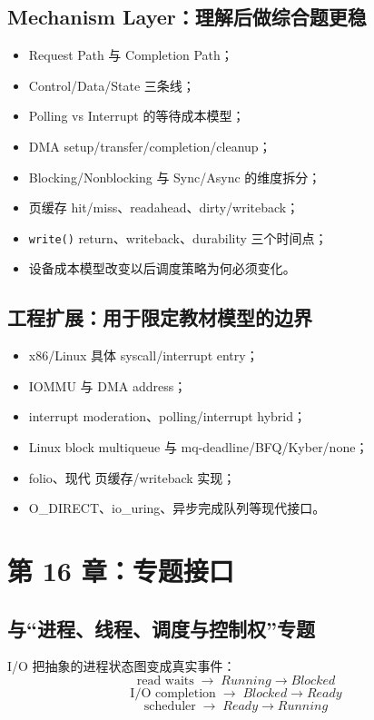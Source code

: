 \documentclass[UTF8,fontset=fandol,11pt,a4paper]{ctexart}
\newcommand{\code}[1]{\texttt{#1}}
\newcommand{\arr}{\;\longrightarrow\;}
\begin{document}
\subsection{Mechanism Layer：理解后做综合题更稳}
\begin{itemize}
  \item Request Path 与 Completion Path；
  \item Control/Data/State 三条线；
  \item Polling vs Interrupt 的等待成本模型；
  \item DMA setup/transfer/completion/cleanup；
  \item Blocking/Nonblocking 与 Sync/Async 的维度拆分；
  \item 页缓存 hit/miss、readahead、dirty/writeback；
  \item \code{write()} return、writeback、durability 三个时间点；
  \item 设备成本模型改变以后调度策略为何必须变化。
\end{itemize}

\subsection{工程扩展：用于限定教材模型的边界}
\begin{itemize}
  \item x86/Linux 具体 syscall/interrupt entry；
  \item IOMMU 与 DMA address；
  \item interrupt moderation、polling/interrupt hybrid；
  \item Linux block multiqueue 与 mq-deadline/BFQ/Kyber/none；
  \item folio、现代 页缓存/writeback 实现；
  \item O\_DIRECT、io\_uring、异步完成队列等现代接口。
\end{itemize}

\section{第 16 章：专题接口}

\subsection{与“进程、线程、调度与控制权”专题}
I/O 把抽象的进程状态图变成真实事件：
\[
\boxed{\text{read waits}\arr Running\to Blocked}
\]
\[
\boxed{\text{I/O completion}\arr Blocked\to Ready}
\]
\[
\boxed{\text{scheduler}\arr Ready\to Running}
\]
\end{document}

